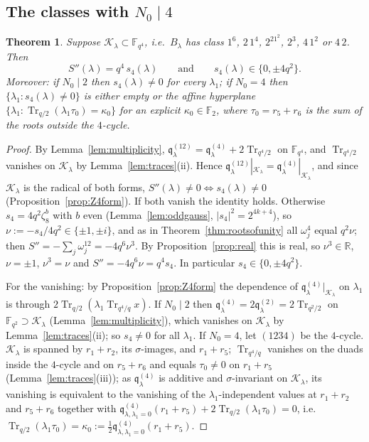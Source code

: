 ﻿\documentclass[12pt,a4paper]{amsart}
\newtheorem{theorem}{Theorem}[section]
\theoremstyle{definition}
\newcommand{\F}{\mathbb{F}}
\newcommand{\Tr}{\operatorname{Tr}}
\newcommand{\Kk}{\mathcal{K}}
\newcommand{\qq}{\mathfrak{q}}
\newcommand{\Spp}{S''}
\begin{document}
\subsection{The classes with \texorpdfstring{$N_0\mid4$}{N0 | 4}}
\begin{theorem}\label{thm:N0div4}
Suppose $\Kk_\lambda\subset\F_{q^4}$, i.e.\ $B_\lambda$ has class $1^6$, $2\,1^4$, $2^21^2$, $2^3$, $4\,1^2$ or $4\,2$. Then
\[
\Spp(\lambda)=q^4\,s_4(\lambda)\qquad\text{and}\qquad s_4(\lambda)\in\{0,\pm4q^2\} .
\]
Moreover: if $N_0\mid2$ then $s_4(\lambda)\ne0$ for every $\lambda_1$; if $N_0=4$ then $\{\lambda_1:s_4(\lambda)\ne0\}$ is either empty or the affine hyperplane $\{\lambda_1:\Tr_{q/2}(\lambda_1\tau_0)=\kappa_0\}$ for an explicit $\kappa_0\in\F_2$, where $\tau_0=r_5+r_6$ is the sum of the roots outside the $4$-cycle.
\end{theorem}
\begin{proof}
By Lemma~\ref{lem:multiplicity}, $\qq^{(12)}_\lambda=\qq^{(4)}_\lambda+2\Tr_{q^4/2}$ on $\F_{q^4}$, and $\Tr_{q^4/2}$ vanishes on $\Kk_\lambda$ by Lemma~\ref{lem:traces}(ii). Hence $\qq^{(12)}_\lambda|_{\Kk_\lambda}=\qq^{(4)}_\lambda|_{\Kk_\lambda}$, and since $\Kk_\lambda$ is the radical of both forms, $\Spp(\lambda)\ne0\iff s_4(\lambda)\ne0$ (Proposition~\ref{prop:Z4form}). If both vanish the identity holds. Otherwise $s_4=4q^2\zeta_8^b$ with $b$ even (Lemma~\ref{lem:oddgauss}, $|s_4|^2=2^{4k+4}$), so $\nu:=-s_4/4q^2\in\{\pm1,\pm i\}$, and as in Theorem~\ref{thm:rootsofunity} all $\omega_j^4$ equal $q^2\nu$; then $\Spp=-\sum_j\omega_j^{12}=-4q^6\nu^3$. By Proposition~\ref{prop:real} this is real, so $\nu^3\in\mathbb R$, $\nu=\pm1$, $\nu^3=\nu$ and $\Spp=-4q^6\nu=q^4s_4$. In particular $s_4\in\{0,\pm4q^2\}$.

For the vanishing: by Proposition~\ref{prop:Z4form} the dependence of $\qq^{(4)}_\lambda|_{\Kk_\lambda}$ on $\lambda_1$ is through $2\Tr_{q/2}(\lambda_1\Tr_{q^4/q}x)$. If $N_0\mid2$ then $\qq^{(4)}_\lambda=2\qq^{(2)}_\lambda=2\Tr_{q^2/2}$ on $\F_{q^2}\supset\Kk_\lambda$ (Lemma~\ref{lem:multiplicity}), which vanishes on $\Kk_\lambda$ by Lemma~\ref{lem:traces}(ii); so $s_4\ne0$ for all $\lambda_1$. If $N_0=4$, let $(1234)$ be the $4$-cycle. $\Kk_\lambda$ is spanned by $r_1+r_2$, its $\sigma$-images, and $r_1+r_5$; $\Tr_{q^4/q}$ vanishes on the duads inside the $4$-cycle and on $r_5+r_6$ and equals $\tau_0\ne0$ on $r_1+r_5$ (Lemma~\ref{lem:traces}(iii)); as $\qq^{(4)}_\lambda$ is additive and $\sigma$-invariant on $\Kk_\lambda$, its vanishing is equivalent to the vanishing of the $\lambda_1$-independent values at $r_1+r_2$ and $r_5+r_6$ together with $\qq^{(4)}_{\lambda,\lambda_1=0}(r_1+r_5)+2\Tr_{q/2}(\lambda_1\tau_0)=0$, i.e.\ $\Tr_{q/2}(\lambda_1\tau_0)=\kappa_0:=\frac12\qq^{(4)}_{\lambda,\lambda_1=0}(r_1+r_5)$.
\end{proof}
\end{document}
